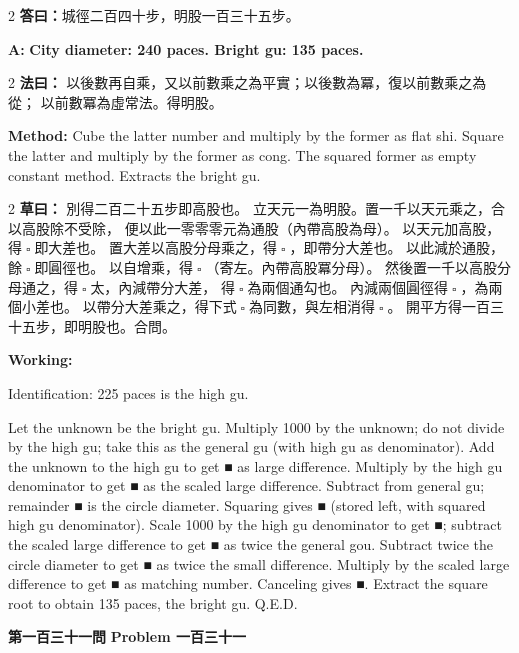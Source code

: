 \documentclass[11pt,a4paper]{article}
\let\origsquare\square
\renewcommand{\square}{\ensuremath{\origsquare}}%
\newcommand{\wen}[1]{%
  \par\vspace{0.5em}%
  \noindent\textcolor{problemcolor}{\textbf{第#1問}}%
  \hfill\textcolor{problemcolor}{\textbf{Problem #1}}\par\nopagebreak%
  \vspace{0.3em}%
}
\newcommand{\fayue}[1]{%
  \noindent\textcolor{methodcolor}{\textbf{法曰：}}{\tradfont #1}\par\nopagebreak%
}
\newcommand{\fayueeng}[1]{%
  \noindent\textcolor{engcolor}{\textbf{Method: }}{#1}\par\nopagebreak%
}
\newcommand{\tsaoyue}[1]{%
  \noindent\textcolor{workcolor}{\textbf{草曰：}}{\tradfont #1}\par%
}
\newcommand{\tsaoyueeng}[1]{%
  \noindent\textcolor{engcolor}{\textbf{Working: }}{\small #1}\par%
}
\newcommand{\dayue}[1]{%
  \noindent\textcolor{anscolor}{\textbf{答曰：}}{\tradfont #1}\par\nopagebreak%
}
\newcommand{\dayueeng}[1]{%
  \noindent\textcolor{engcolor}{\textbf{A: }}{\bfseries #1}\par\nopagebreak%
}
\begin{document}
\begin{paracol}{2}
\dayue{城徑二百四十步，明股一百三十五步。}
\switchcolumn
\dayueeng{City diameter: 240 paces. Bright gu: 135 paces.}
\end{paracol}

\begin{paracol}{2}
\fayue{%
以後數再自乘，又以前數乘之為平實；以後數為冪，復以前數乘之為從；
以前數冪為虛常法。得明股。}
\switchcolumn
\fayueeng{%
Cube the latter number and multiply by the former as flat shi. Square the latter and multiply by the former as cong. The squared former as empty constant method. Extracts the bright gu.}
\end{paracol}

\begin{paracol}{2}
\tsaoyue{%
別得二百二十五步即高股也。
立天元一為明股。置一千以天元乘之，合以高股除不受除，
便以此一零零零元為通股（內帶高股為母）。
以天元加高股，得$ \; \square \; $即大差也。
置大差以高股分母乘之，得$ \; \square \; $，即帶分大差也。
以此減於通股，餘$ \; \square \; $即圓徑也。
以自增乘，得$ \; \square \; $（寄左。內帶高股冪分母）。
然後置一千以高股分母通之，得$ \; \square \; $太，內減帶分大差，
得$ \; \square \; $為兩個通勾也。
內減兩個圓徑得$ \; \square \; $，為兩個小差也。
以帶分大差乘之，得下式$ \; \square \; $為同數，與左相消得$ \; \square \; $。
開平方得一百三十五步，即明股也。合問。}
\switchcolumn
\tsaoyueeng{%
Identification: 225 paces is the high gu.

Let the unknown be the bright gu. Multiply 1000 by the unknown; do not divide by the high gu; take this as the general gu (with high gu as denominator). Add the unknown to the high gu to get ■ as large difference. Multiply by the high gu denominator to get ■ as the scaled large difference. Subtract from general gu; remainder ■ is the circle diameter. Squaring gives ■ (stored left, with squared high gu denominator). Scale 1000 by the high gu denominator to get ■; subtract the scaled large difference to get ■ as twice the general gou. Subtract twice the circle diameter to get ■ as twice the small difference. Multiply by the scaled large difference to get ■ as matching number. Canceling gives ■. Extract the square root to obtain 135 paces, the bright gu. Q.E.D.}
\end{paracol}

\vspace{0.5cm}

\wen{一百三十一}
\end{document}
